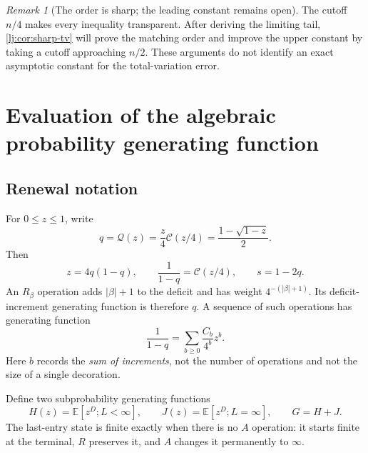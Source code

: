 \documentclass[11pt,a4paper]{article}
\theoremstyle{definition}\newaliascnt{definition}{theorem}
\theoremstyle{remark}\newaliascnt{remark}{theorem}
\newtheorem{remark}[remark]{Remark}
\newcommand{\Cat}{\mathcal C}
\newcommand{\ljE}{\mathbb E}
\newcommand{\ljQ}{\mathcal Q}
\begin{document}
\begin{remark}[The order is sharp; the leading constant remains open]
The cutoff $n/4$ makes every inequality transparent. After deriving the
limiting tail, \cref{lj:cor:sharp-tv} will prove the matching order and improve
the upper constant by taking a cutoff approaching $n/2$. These arguments
do not identify an exact asymptotic constant for the total-variation
error.
\end{remark}

\section{Evaluation of the algebraic probability generating function}
\label{lj:sec:pgf}

\subsection{Renewal notation}
For $0\le z\le1$, write
\begin{equation}
 q=\ljQ(z)=\frac z4\Cat(z/4)
 =\frac{1-\sqrt{1-z}}2.
 \label{lj:eq:q}
\end{equation}
Then
\begin{equation}
 z=4q(1-q),\qquad
 \frac1{1-q}=\Cat(z/4),\qquad s=1-2q.
 \label{lj:eq:q-identities}
\end{equation}
An $R_\beta$ operation adds $|\beta|+1$ to the deficit and has
weight $4^{-(|\beta|+1)}$. Its deficit-increment generating function is
therefore $q$. A sequence of such operations has generating function
\begin{equation}
 \frac1{1-q}=\sum_{b\ge0}\frac{C_b}{4^b}z^b.
 \label{lj:eq:R-renewal}
\end{equation}
Here $b$ records the \emph{sum of increments}, not the number of
operations and not the size of a single decoration.

Define two subprobability generating functions
\begin{equation}
 H(z)=\ljE[z^D;L<\infty],\qquad
 J(z)=\ljE[z^D;L=\infty],\qquad G=H+J.
 \label{lj:eq:H-J}
\end{equation}
The last-entry state is finite exactly when there is no $A$ operation:
it starts finite at the terminal, $R$ preserves it, and $A$ changes it
permanently to $\infty$.
\end{document}
